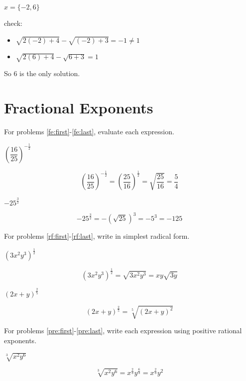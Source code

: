 \documentclass[fleqn,addpoints]{exam}
\begin{document}
\begin{questions}
\begin{solution}[7 cm]
$x = \{-2, 6\}$

check:
\begin{itemize}
  \item $\sqrt{2(-2)+4} - \sqrt{(-2)+3} = -1 \neq 1$
  \item $\sqrt{2(6)+4} - \sqrt{6+3} = 1$
\end{itemize}

So $6$ is the only solution.

\end{solution}

\section{Fractional Exponents}

For problems \ref{fe:first}-\ref{fe:last}, evaluate each expression.

\question[5] \( \left( \dfrac{16}{25} \right)^{- \frac{1}{2}} \)
\label{fe:first}
\begin{solution}[2 cm]
\[
  \left( \dfrac{16}{25} \right)^{- \frac{1}{2}} = \left( \dfrac{25}{16} \right)^{\frac{1}{2}} = \sqrt{\frac{25}{16}} = \frac{5}{4}
\]
\end{solution}

\question[5] \( -25^{\frac{3}{2}} \)
\label{fe:last}
\begin{solution}[2 cm]
\[
  -25^{\frac{3}{2}} = - (\sqrt{25})^3 = -5^3 = -125
\]
\end{solution}

For problems \ref{rf:first}-\ref{rf:last}, write in simplest radical form.

\question[3] \( (3x^2y^3)^{\frac{1}{2}} \)
\label{rf:first}
\begin{solution}[2 cm]
\[
  (3x^2y^3)^{\frac{1}{2}} = \sqrt{3x^2y^3} = xy\sqrt{3y}
\]
\end{solution}

\question[3] \( (2x+y)^{\frac{2}{5}} \)
\label{rf:last}
\begin{solution}[2 cm]
\[
  (2x+y)^{\frac{2}{5}} = \sqrt[5]{(2x+y)^2}
\]
\end{solution}

For problems \ref{pre:first}-\ref{pre:last}, write each expression using positive rational exponents.

\question[3] \( \sqrt[3]{x^2y^6} \)
\label{pre:first}
\begin{solution}[3 cm]
\[
  \sqrt[3]{x^2y^6} = x^{\frac{2}{3}} y^{\frac{6}{3}} = x^{\frac{2}{3}} y^2
\]
\end{solution}


\end{questions}
\end{document}
